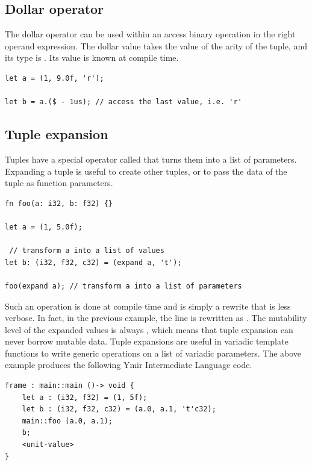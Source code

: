 \subsection {Dollar operator}

The dollar operator can be used within an access binary operation in the right
operand expression. The dollar value takes the value of the arity of the tuple,
and its type is . Its value is known at compile time.

\begin{lstlisting}[style=coloredverbatim]
let a = (1, 9.0f, 'r');

let b = a.($ - 1us); // access the last value, i.e. 'r'
\end{lstlisting}

\subsection {Tuple expansion}

Tuples have a special operator called  that turns them into a
list of parameters. Expanding a tuple is useful to create other tuples, or to
pass the data of the tuple as function parameters.

\begin{lstlisting}[style=coloredverbatim]
fn foo(a: i32, b: f32) {}

let a = (1, 5.0f);

 // transform a into a list of values
let b: (i32, f32, c32) = (expand a, 't');

foo(expand a); // transform a into a list of parameters
\end{lstlisting}

Such an operation is done at compile time and is simply a rewrite that is less
verbose. In fact, in the previous example, the line  is
rewritten as . The mutability level of the expanded
values is always , which means that tuple expansion can never borrow
mutable data. Tuple expansions are useful in variadic template functions to
write generic operations on a list of variadic parameters. The above example produces the following Ymir Intermediate Language code.

\begin{lstlisting}[style=myilVerb]
frame : main::main ()-> void {
    let a : (i32, f32) = (1, 5f);
    let b : (i32, f32, c32) = (a.0, a.1, 't'c32);
    main::foo (a.0, a.1);
    b;
    <unit-value>
}
\end{lstlisting}

